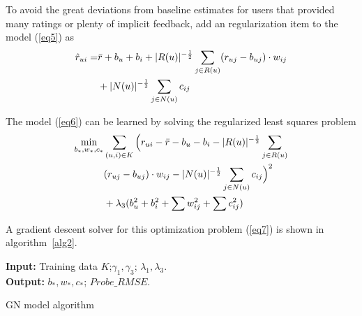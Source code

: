 \documentclass[journal]{IEEEtran}
\begin{document}
To avoid the great deviations from baseline estimates for users that provided many ratings or plenty of implicit feedback, add an regularization item to the model (\ref{eq5}) as
\begin{align}
\label{eq6}
\hat{r}_{ui} = & \bar{r} + b_u + b_i + |R(u)|^{-\frac{1}{2}} \sum_{j \in R(u)} (r_{uj} - b_{uj}) \cdot w_{ij}  \notag \\
& + |N(u)|^{-\frac{1}{2}} \sum_{j \in N(u)}  c_{ij}
\end{align}

The  model (\ref{eq6}) can be learned by solving the regularized least squares problem
\begin{align}
\label{eq7}
\min_{b_*, w_*, c_*}  & \sum_{(u,i) \in K} \Big( r_{ui} - \bar{r} - b_u - b_i - |R(u)|^{-\frac{1}{2}} \sum_{j \in R(u)} \notag \\
& (r_{uj} - b_{uj}) \cdot w_{ij} -  |N(u)|^{-\frac{1}{2}} \sum_{j \in N(u)}  c_{ij} \Big)^2 \notag \\
& + \lambda_3 (b_u^2 + b_i^2 +\sum w_{ij}^2 + \sum c_{ij}^2)
\end{align}

A gradient descent solver for this optimization problem (\ref{eq7}) is shown in algorithm~\ref{alg2}.

\begin{algorithm}[ht]
 \SetAlgoLined  %
 \textbf{Input:} {Training data $K$;$\gamma_1, \gamma_3$; $\lambda_1, \lambda_3$.} \\
 \textbf{Output:} {$b_*, w_*, c_*$; $Probe\_RMSE$.} \\

 \caption{GN model algorithm}
\label{alg2}
\end{algorithm}
\end{document}
